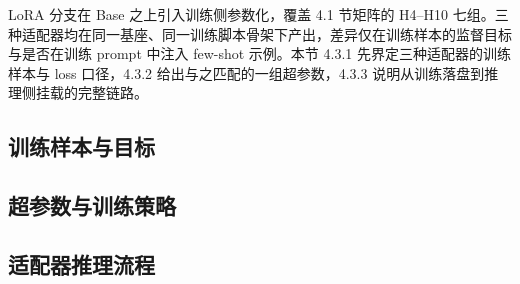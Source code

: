 
LoRA 分支在 Base 之上引入训练侧参数化，覆盖 4.1 节矩阵的 H4--H10 七组。三种适配器均在同一基座、同一训练脚本骨架下产出，差异仅在训练样本的监督目标与是否在训练 prompt 中注入 few-shot 示例。本节 4.3.1 先界定三种适配器的训练样本与 loss 口径，4.3.2 给出与之匹配的一组超参数，4.3.3 说明从训练落盘到推理侧挂载的完整链路。

\subsection{训练样本与目标}


\subsection{超参数与训练策略}


\subsection{适配器推理流程}
